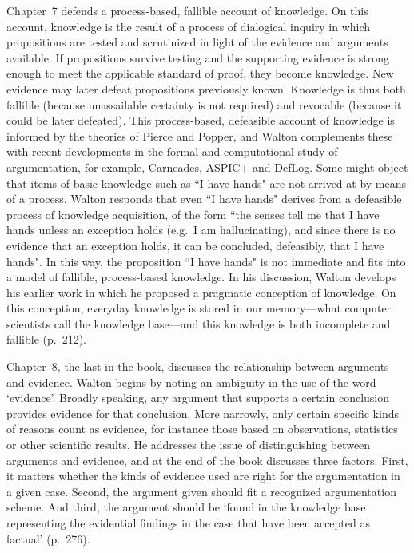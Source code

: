 \documentclass[12pt]{article}
\begin{document}
Chapter~7 defends a process-based, fallible account of knowledge. On
this account, knowledge is the result of a process of dialogical inquiry in which
propositions are tested and scrutinized in light of the evidence and arguments
available. If propositions survive testing and the supporting evidence is
strong enough to meet the applicable standard of proof, they become
knowledge. New evidence may later defeat propositions
previously known. Knowledge is thus both fallible (because unassailable certainty is not required) 
and revocable (because it could be later defeated).
This process-based, defeasible
account of knowledge is informed by the theories of Pierce and Popper,
and Walton complements these with recent developments in the formal and computational study of argumentation,
for example, Carneades, ASPIC+ and DefLog.
Some might object that items of basic knowledge such as ``I have hands"
are not arrived at by means of a process. Walton responds that even ``I
have hands" derives from a defeasible process of knowledge
acquisition, of the form ``the senses tell me that I have hands unless
an exception holds (e.g.\ I am hallucinating), and since there is no
evidence that an exception holds, it can be concluded, defeasibly,
that I have hands". In this way, the proposition ``I have hands" is not immediate and fits into a model of fallible, process-based
knowledge. In his discussion, Walton develops his earlier work in which he proposed a pragmatic 
conception of knowledge. On this conception, 
everyday knowledge is stored in our memory---what computer scientists 
call the knowledge base---and this knowledge is both incomplete 
and fallible (p.\ 212).

Chapter~8, the last in the book, discusses the relationship between
arguments and evidence. Walton begins by noting an ambiguity in the
use of the word `evidence'. Broadly speaking, any argument that
supports a certain conclusion provides evidence for that conclusion. More
narrowly, only certain specific kinds of reasons count as evidence, for instance those based on observations, statistics or other scientific results. He addresses the issue of distinguishing between arguments and evidence, and at the end of the book discusses three factors. First, it matters whether the kinds of evidence used are right for the argumentation in a given case. Second, the argument given should fit a recognized argumentation scheme. 
And third, the argument should be `found in the knowledge base representing the evidential findings in the case that have been accepted as factual'
(p.\ 276).
\end{document}
